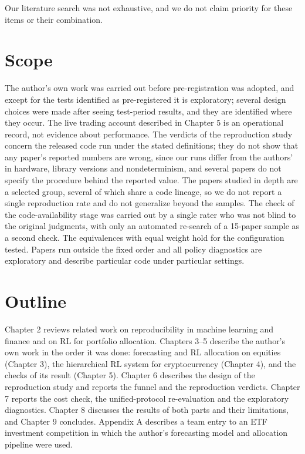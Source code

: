 \documentclass[12pt,a4paper]{report}
\begin{document}
Our literature search was not exhaustive, and we do not claim priority
for these items or their combination.

\section{Scope}\label{scope}

The author's own work was carried out before pre-registration was
adopted, and except for the tests identified as pre-registered it is
exploratory; several design choices were made after seeing test-period
results, and they are identified where they occur. The live trading
account described in Chapter 5 is an operational record, not evidence
about performance. The verdicts of the reproduction study concern the
released code run under the stated definitions; they do not show that
any paper's reported numbers are wrong, since our runs differ from the
authors' in hardware, library versions and nondeterminism, and several
papers do not specify the procedure behind the reported value. The
papers studied in depth are a selected group, several of which share a
code lineage, so we do not report a single reproduction rate and do not
generalize beyond the samples. The check of the code-availability stage
was carried out by a single rater who was not blind to the original
judgments, with only an automated re-search of a 15-paper sample as a
second check. The equivalences with equal weight hold for the
configuration tested. Papers run outside the fixed order and all policy
diagnostics are exploratory and describe particular code under
particular settings.

\section{Outline}\label{outline}

Chapter 2 reviews related work on reproducibility in machine learning
and finance and on RL for portfolio allocation. Chapters 3--5 describe
the author's own work in the order it was done: forecasting and RL
allocation on equities (Chapter 3), the hierarchical RL system for
cryptocurrency (Chapter 4), and the checks of its result (Chapter 5).
Chapter 6 describes the design of the reproduction study and reports the
funnel and the reproduction verdicts. Chapter 7 reports the cost check,
the unified-protocol re-evaluation and the exploratory diagnostics.
Chapter 8 discusses the results of both parts and their limitations, and
Chapter 9 concludes. Appendix A describes a team entry to an ETF
investment competition in which the author's forecasting model and
allocation pipeline were used.
\end{document}
